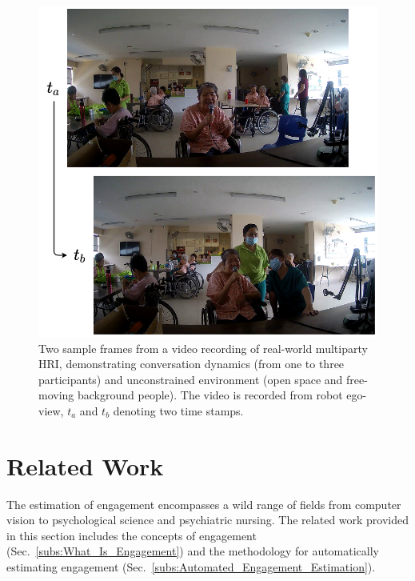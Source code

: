 \documentclass[10pt,journal,compsoc]{IEEEtran}
\begin{document}
\begin{figure}[t]
  \centering
  \includegraphics[width=\linewidth]{assets/interaction_sample.drawio.png}
  \caption{Two sample frames from a video recording of real-world multiparty HRI, demonstrating conversation dynamics (from one to three participants) and unconstrained environment (open space and free-moving background people). The video is recorded from robot ego-view, $t_a$ and $t_b$ denoting two time stamps.}
  \label{f:interaction_sample}
\end{figure}


\section{Related Work}
\label{s:Related_Work}

The estimation of engagement encompasses a wild range of fields from computer vision to psychological science and psychiatric nursing. The related work provided in this section includes the concepts of engagement (Sec.~\ref{subs:What_Is_Engagement}) and the methodology for automatically estimating engagement (Sec.~\ref{subs:Automated_Engagement_Estimation}).
\end{document}
